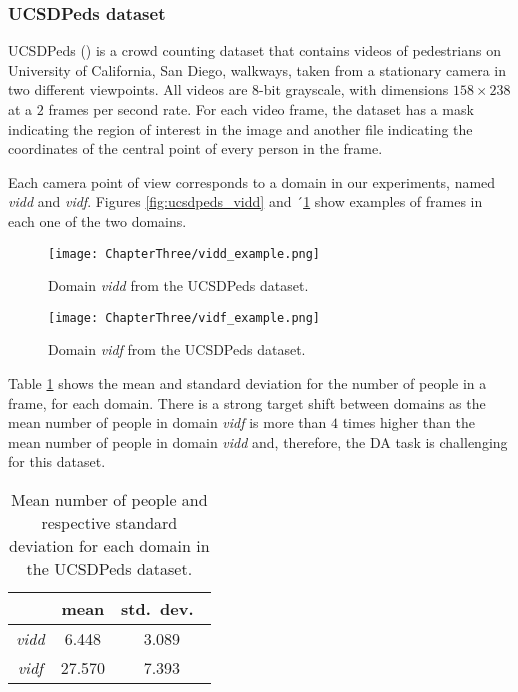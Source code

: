 \subsubsection{UCSDPeds dataset}
\label{sec:da_sensors_ucsdpeds}

UCSDPeds (\citet{Chan2008}) is a crowd counting dataset that contains videos of pedestrians on University of California, San Diego, walkways, taken from a stationary camera in two different viewpoints. All videos are 8-bit grayscale, with dimensions $158 \times 238$ at a $2$ frames per second rate. For each video frame, the dataset has a mask indicating the region of interest in the image and another file indicating the coordinates of the central point of every person in the frame.

Each camera point of view corresponds to a domain in our experiments, named \textit{vidd} and \textit{vidf}. Figures \ref{fig:ucsdpeds_vidd} and ´\ref{fig:ucsdpeds_vidf} show examples of frames in each one of the two domains.

\begin{figure}[!ht]
	\centering
	\begin{minipage}[b]{0.4\textwidth}
		\texttt{[image: ChapterThree/vidd\_example.png]}
		\caption{Domain \textit{vidd} from the UCSDPeds dataset.}
		\label{fig:ucsdpeds_vidd}
	\end{minipage}
	\hfill
	\begin{minipage}[b]{0.4\textwidth}
		\texttt{[image: ChapterThree/vidf\_example.png]}
		\caption{Domain \textit{vidf} from the UCSDPeds dataset.}
		\label{fig:ucsdpeds_vidf}
	\end{minipage}
\end{figure}

Table \ref{tab:ucsdpeds_domains} shows the mean and standard deviation for the number of people in a frame, for each domain. There is a strong target shift between domains as the mean number of people in domain \textit{vidf} is more than $4$ times higher than the mean number of people in domain \textit{vidd} and, therefore, the DA task is challenging for this dataset.

\begin{table}[!ht]
	\centering
	\begin{tabular}{c| c c}
		 & mean & std.\ dev.\  \\
		\hline
		\textit{vidd} & 6.448 & 3.089\\
		\textit{vidf} & 27.570 & 7.393 \\
	\end{tabular}
	\caption{Mean number of people and respective standard deviation for each domain in the UCSDPeds dataset.}
	\label{tab:ucsdpeds_domains}
\end{table}

